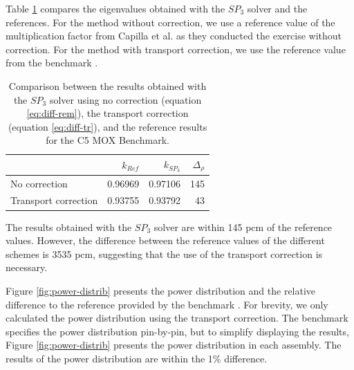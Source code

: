 \documentclass{anstrans}
\begin{document}
Table \ref{tab:keff-2nd} compares the eigenvalues obtained with the $SP_3$ solver and the references.
For the method without correction, we use a reference value of the multiplication factor from Capilla et al. \cite{capilla_applications_2009} as they conducted the exercise without correction.
For the method with transport correction, we use the reference value from the benchmark \cite{cavarec_benchmark_1994}.
\begin{table}[htbp!]
	\centering
	\caption{Comparison between the results obtained with the $SP_3$ solver using no correction (equation \ref{eq:diff-rem}), the transport correction (equation \ref{eq:diff-tr}), and the reference results for the C5 MOX Benchmark.}
	\label{tab:keff-2nd}
	\begin{tabular}{lrrr}
	\toprule
							& $k_{Ref}$ & $k_{SP_3}$	& $\Delta_{\rho}$	\\
	\midrule
	No correction			& 0.96969	& 0.97106		& 145				\\
	Transport correction	& 0.93755	& 0.93792		& 43				\\
	\bottomrule
	\end{tabular}
\end{table}

The results obtained with the $SP_3$ solver are within 145 pcm of the reference values.
However, the difference between the reference values of the different schemes is 3535 pcm, suggesting that the use of the transport correction is necessary.

Figure \ref{fig:power-distrib} presents the power distribution and the relative difference to the reference provided by the benchmark \cite{cavarec_benchmark_1994}.
For brevity, we only calculated the power distribution using the transport correction.
The benchmark specifies the power distribution pin-by-pin, but to simplify displaying the results, Figure \ref{fig:power-distrib} presents the power distribution in each assembly.
The results of the power distribution are within the 1\% difference.
\end{document}
